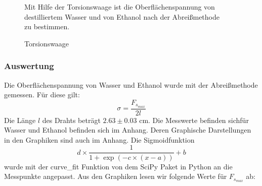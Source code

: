\documentclass[11pt,a4paper]{article}
\begin{document}
\begin{figure}[h]
\begin{minipage}{.6\textwidth}
Mit Hilfe der Torsionswaage ist die Oberfl\"achenspannung von\\ destilliertem Wasser und von Ethanol nach der Abrei\ss methode\\ zu bestimmen.
\end{minipage}%
\begin{minipage}{.4\textwidth}
\centering
{}
   \renewcommand\thefigure{B2}
\caption[Torsionswaage]{Torsionswaage \cite{Anleitung}}
\label{NS1}
\end{minipage}
\end{figure}
\subsubsection{Auswertung}
Die Oberfl\"achenspannung von Wasser und Ethanol wurde mit der Abrei\ss methode gemessen. F\"ur diese gilt:
\begin{equation}
\sigma=\frac{F_{s_{max}}}{2l}\label{eqo}
\end{equation}
Die L\"ange $l$ des Drahts betr\"agt $2.63\pm0.03$ cm. Die Messwerte befinden sichf\"ur Wasser und Ethanol befinden sich im Anhang. Deren Graphische Darstellungen in den Graphiken sind auch im Anhang. Die Sigmoidfunktion 
\begin{equation}
d\times\frac{1}{1+\exp(-c\times(x-a))}+b
\end{equation} 
wurde mit der curve\_fit Funktion von dem SciPy Paket in Python an die Messpunkte angepasst. Aus den Graphiken lesen wir folgende Werte f\"ur $F_{s_{max}}$ ab:
\end{document}
